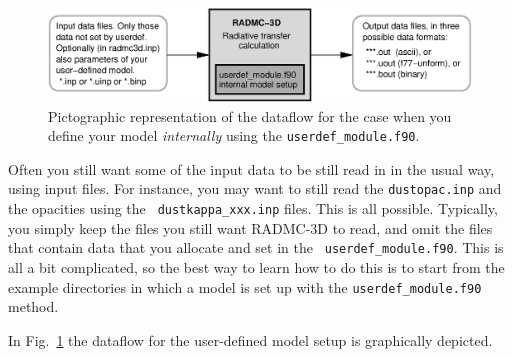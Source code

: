 \documentclass{report}
\begin{document}
%
\begin{figure}
\centerline{\includegraphics[height=0.13\textwidth]{dataflow_basic_userdef.eps}}
\caption{\label{fig-dataflow-basic-userdef}
Pictographic representation of the dataflow for the case when you 
define your model {\em internally} using the {\small\tt userdef\_module.f90}. 
}
\end{figure}
%

Often you still want some of the input data to be still read in in the usual
way, using input files. For instance, you may want to still read the
{\small\tt dustopac.inp} and the opacities using the {\small\tt
  dustkappa\_xxx.inp} files. This is all possible. Typically, you simply
keep the files you still want RADMC-3D to read, and omit the files that
contain data that you allocate and set in the {\small\tt
  userdef\_module.f90}. This is all a bit complicated, so the best way
to learn how to do this is to start from the example directories in which
a model is set up with the {\small\tt userdef\_module.f90} method.

In Fig.~\ref{fig-dataflow-basic-userdef} the dataflow for the user-defined
model setup is graphically depicted.
\end{document}
